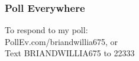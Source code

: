 \documentclass[12pt, 
hyperref={colorlinks=true, linkcolor=blue, urlcolor=cyan}]{beamer}
\begin{document}
\begin{frame}
\frametitle{Poll Everywhere}

To respond to my poll: \\
PollEv.com/briandwillia675, or \\
Text BRIANDWILLIA675 to 22333

\end{frame}
\end{document}

